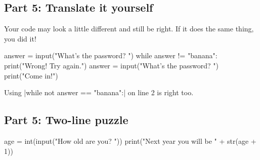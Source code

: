 \subsection*{Part 5: Translate it yourself}
Your code may look a little different and still be right. If it does the same thing, you did it!
\begin{codenonum}
answer = input("What's the password? ")
while answer != "banana":
    print("Wrong! Try again.")
    answer = input("What's the password? ")
print("Come in!")
\end{codenonum}
Using \py|while not answer == "banana":| on line 2 is right too.

\subsection*{Part 5: Two-line puzzle}
\begin{codenonum}
age = int(input("How old are you? "))
print("Next year you will be " + str(age + 1))
\end{codenonum}
